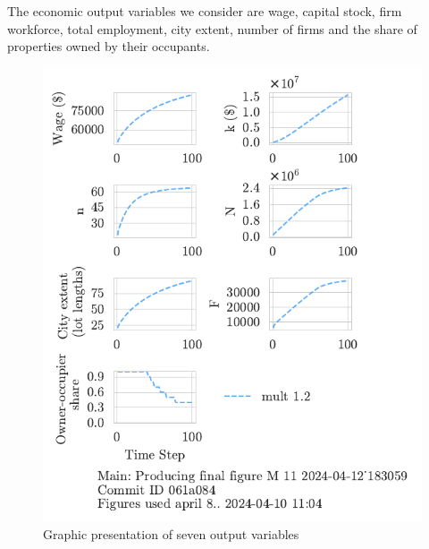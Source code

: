The economic output variables we consider are wage, capital stock, firm workforce, total employment, city extent, number of firms and the share of properties owned by their occupants. 
\begin{figure}[h!t]
\centering
\includegraphics[scale=1.0, trim={0 1.4cm 0 0},clip]{fig/plain-for-intro_183059.pdf}
\caption[Graphic presentation of seven output variables]{Graphic presentation of seven output variables}
\label{fig:plain-for-intro}
\end{figure}
